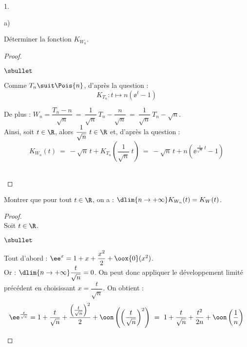 \documentclass[11pt]{article}%
\begin{document}
\begin{noliste}{1.}
\begin{noliste}{a)}
  \item Déterminer la fonction $K_{W_n}$.
    \begin{proof}~
      \begin{noliste}{$\sbullet$}
      \item Comme $T_n \suit \Pois{n}$, d'après la question
         :
        \[
          K_{T_n} : t \mapsto n(\ee^t -1)
        \]
        
      \item De plus : $W_n = \dfrac{T_n -n}{\sqrt{n}} \ = \
        \dfrac{1}{\sqrt{n}} \ T_n - \dfrac{n}{\sqrt{n}} \ = \
        \dfrac{1}{\sqrt{n}} \ T_n - \sqrt{n}$.\\
        Ainsi, soit $t \in \R$, alors $\dfrac{1}{\sqrt{n}} \ t \in \R$
        et, d'après la question \itbf{5.b)} :
        \[
          K_{W_n}(t) \ = \ -\sqrt{n} \, t + K_{T_n}\left(
            \dfrac{1}{\sqrt{n}} \ t\right) \ = \ -\sqrt{n} \, t + n
          \left(\ee^{\frac{1}{\sqrt{n}} \ t} -1\right)
        \]
      \end{noliste}
      ~\\[-1cm]
    \end{proof}
    

    \newpage


  \item Montrer que pour tout $t \in \R$, on a : $\dlim{n\to +\infty}
    K_{W_n}(t) = K_W(t)$.
    \begin{proof}~\\
      Soit $t \in \R$.
      \begin{noliste}{$\sbullet$}
      \item Tout d'abord : $\ee^x = 1+x+ \dfrac{x^2}{2} +
        \oox{0}(x^2)$.\\
        Or : $\dlim{n \to +\infty} \dfrac{t}{\sqrt{n}} = 0$. On peut
        donc appliquer le développement limité précédent en
        choisissant $x = \dfrac{t}{\sqrt{n}}$. On obtient :
        \[
          \ee^{\frac{t}{\sqrt{n}}} = 1 + \dfrac{t}{\sqrt{n}} +
          \dfrac{\left(\frac{t}{\sqrt{n}}\right)^2}{2} +
          \oon \left(\left(\dfrac{t}{\sqrt{n}}
          \right)^2\right) \ = \ 1+ \dfrac{t}{\sqrt{n}} +
          \dfrac{t^2}{2n} + \oon\left( \dfrac{1}{n}\right)
        \]
        

\end{noliste}
\end{proof}
\end{noliste}
\end{noliste}
\end{document}
